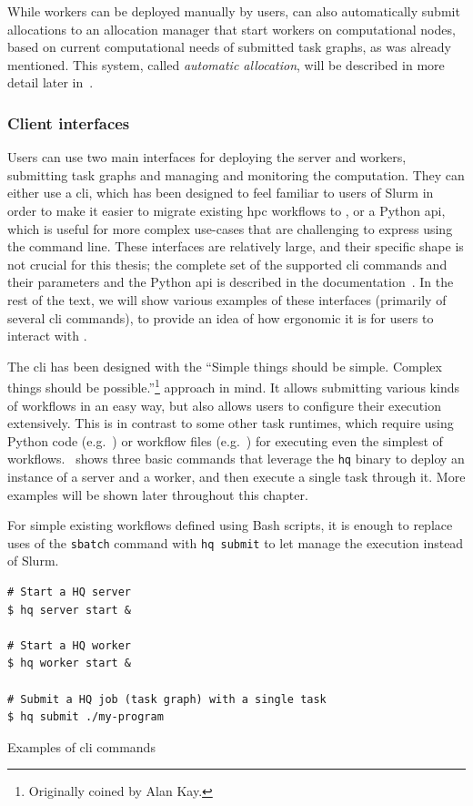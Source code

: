 While workers can be deployed manually by users, \hq{} can also automatically
submit allocations to an allocation manager that start workers on computational nodes, based on
current computational needs of submitted task graphs, as was already mentioned. This system, called
\emph{automatic allocation}, will be described in more detail later in~.

\subsubsection*{Client interfaces}
Users can use two main interfaces for deploying the \hyperqueue{} server and workers,
submitting task graphs and managing and monitoring the computation. They can either use a
\gls{cli}, which has been designed to feel familiar to users of Slurm in order to
make it easier to migrate existing \gls{hpc} workflows to \hyperqueue{}, or
a Python \gls{api}, which is useful for more complex use-cases that are challenging
to express using the command line. These interfaces are relatively large, and their specific shape
is not crucial for this thesis; the complete set of the supported \gls{cli} commands
and their parameters and the Python \gls{api} is described in the
\hyperqueue{} documentation~\cite{hq_docs}. In the rest of the text, we will
show various examples of these interfaces (primarily of several \gls{cli} commands),
to provide an idea of how ergonomic it is for users to interact with \hyperqueue{}.

The \gls{cli} has been designed with the ``Simple things should be simple. Complex
things should be possible.''\footnote{Originally coined by Alan Kay.} approach in mind. It allows submitting various
kinds of workflows in an easy way, but also allows users to configure their execution extensively.
This is in contrast to some other task runtimes, which require using Python code (e.g.\
\dask{}) or workflow files (e.g.\ \snakemake{}) for executing even the
simplest of workflows.~\Autoref{lst:hq-cli-commands} shows three basic commands that leverage the
\texttt{hq} binary to deploy an instance of a \hyperqueue{} server and a
worker, and then execute a single task through it. More examples will be shown later throughout
this chapter.

For simple existing workflows defined using Bash scripts, it is enough to replace uses of the
\texttt{sbatch} command with \texttt{hq submit} to let \hyperqueue{} manage
the execution instead of Slurm.

\begin{listing}[h]
	\begin{verbatim}
# Start a HQ server
$ hq server start &

# Start a HQ worker
$ hq worker start &

# Submit a HQ job (task graph) with a single task
$ hq submit ./my-program
	\end{verbatim}
	\caption{Examples of \hyperqueue{} \gls{cli} commands}
	\label{lst:hq-cli-commands}
\end{listing}

